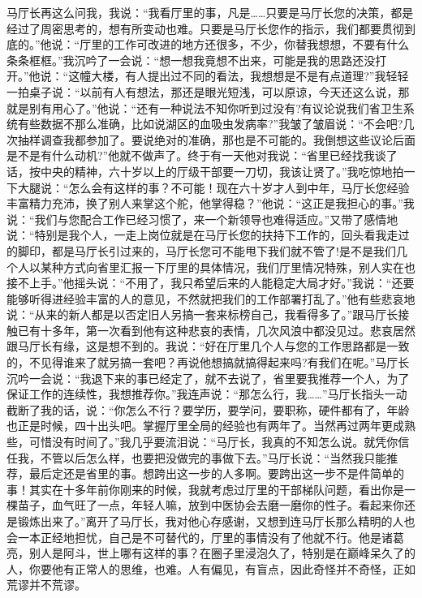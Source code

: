 \documentclass[12pt,oneside]{book}
\begin{document}
马厅长再这么问我，我说：``我看厅里的事，凡是\ldots\ldots 只要是马厅长您的决策，都是经过了周密思考的，想有所变动也难。只要是马厅长您作的指示，我们都要贯彻到底的。''他说：``厅里的工作可改进的地方还很多，不少，你替我想想，不要有什么条条框框。''我沉吟了一会说：``想一想我竟想不出来，可能是我的思路还没打开。''他说：``这幢大楼，有人提出过不同的看法，我想想是不是有点道理?''我轻轻一拍桌子说：``以前有人有想法，那还是眼光短浅，可以原谅，今天还这么说，那就是别有用心了。''他说：``还有一种说法不知你听到过没有?有议论说我们省卫生系统有些数据不那么准确，比如说湖区的血吸虫发病率?''我皱了皱眉说：``不会吧?几次抽样调查我都参加了。要说绝对的准确，那也是不可能的。我倒想这些议论后面是不是有什么动机?''他就不做声了。终于有一天他对我说：``省里已经找我谈了话，按中央的精神，六十岁以上的厅级干部要一刀切，我该让贤了。''我吃惊地拍一下大腿说：``怎么会有这样的事？不可能！现在六十岁才人到中年，马厅长您经验丰富精力充沛，换了别人来掌这个舵，他掌得稳？''他说：``这正是我担心的事。''我说：``我们与您配合工作已经习惯了，来一个新领导也难得适应。''又带了感情地说：``特别是我个人，一走上岗位就是在马厅长您的扶持下工作的，回头看我走过的脚印，都是马厅长引过来的，马厅长您可不能甩下我们就不管了!是不是我们几个人以某种方式向省里汇报一下厅里的具体情况，我们厅里情况特殊，别人实在也接不上手。''他摇头说：``不用了，我只希望后来的人能稳定大局才好。''我说：``还要能够听得进经验丰富的人的意见，不然就把我们的工作部署打乱了。''他有些悲哀地说：``从来的新人都是以否定旧人另搞一套来标榜自己，我看得多了。''跟马厅长接触已有十多年，第一次看到他有这种悲哀的表情，几次风浪中都没见过。悲哀居然跟马厅长有缘，这是想不到的。我说：``好在厅里几个人与您的工作思路都是一致的，不见得谁来了就另搞一套吧？再说他想搞就搞得起来吗?有我们在呢。''马厅长沉吟一会说：``我退下来的事已经定了，就不去说了，省里要我推荐一个人，为了保证工作的连续性，我想推荐你。''我连声说：``那怎么行，我\ldots\ldots{}''马厅长指头一动截断了我的话，说：``你怎么不行？要学历，要学问，要职称，硬件都有了，年龄也正是时候，四十出头吧。掌握厅里全局的经验也有两年了。当然再过两年更成熟些，可惜没有时间了。''我几乎要流泪说：``马厅长，我真的不知怎么说。就凭你信任我，不管以后怎么样，也要把没做完的事做下去。''马厅长说：``当然我只能推荐，最后定还是省里的事。想跨出这一步的人多啊。要跨出这一步不是件简单的事！其实在十多年前你刚来的时候，我就考虑过厅里的干部梯队问题，看出你是一棵苗子，血气旺了一点，年轻人嘛，放到中医协会去磨一磨你的性子。看起来你还是锻炼出来了。''离开了马厅长，我对他心存感谢，又想到连马厅长那么精明的人也会一本正经地担忧，自己是不可替代的，厅里的事情没有了他就不行。他是诸葛亮，别人是阿斗，世上哪有这样的事？在圈子里浸泡久了，特别是在巅峰呆久了的人，你要他有正常人的思维，也难。人有偏见，有盲点，因此奇怪并不奇怪，正如荒谬并不荒谬。
\end{document}
